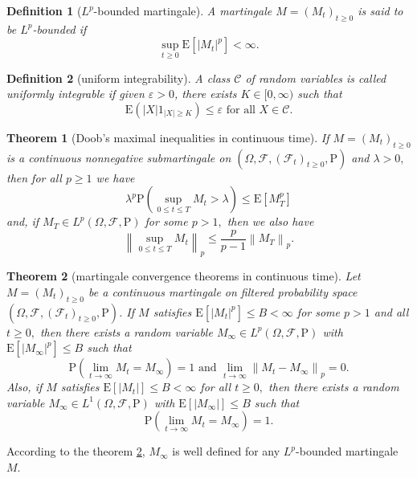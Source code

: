 \documentclass{report}
\newtheorem{definition}{Definition}[section]
\newtheorem{theorem}{Theorem}[section]
\theoremstyle{nonumberplain}
\begin{document}
\begin{definition}[$L^p$-bounded martingale]
	A martingale $M=(M_t)_{t\ge0}$ is said to be $L^p$-\emph{bounded} if 
	$$
	\sup _{t \geq 0} \mathrm{E}\left[|M_{t}|^{p}\right]<\infty.
	$$
\end{definition}


\begin{definition}[uniform integrability]
	A class $\mathcal {C}$ of random variables is called \emph{uniformly integrable} if given $\varepsilon >0$, there exists $K\in [0,\infty )$ such that 
	\[
	\mathrm{E}\left(|X| 1_{|X| \geq K}\right) \leq \varepsilon \text { for all } X \in \mathcal{C}.
	\]	
\end{definition}

\begin{theorem}[Doob's maximal inequalities in continuous time]
If $M=(M_{t})_{t\ge0}$ is a continuous nonnegative submartingale on $(\Omega,\mathcal{F},(\mathcal{F}_{t})_{t\ge0},\mathrm{P})$ and $\lambda>0,$ then for all $p \geq 1$ we have
\[
\lambda^{p} \mathrm{P}\left(\sup_{0 \le t \le T} M_{t}>\lambda\right) \le \mathrm{E}\left[M_{T}^{p}\right]
\]
and, if $M_{T} \in L^{p}(\Omega,\mathcal{F},\mathrm{P})$ for some $p>1,$ then we also have
\[
\left\|\sup_{0 \leq t \leq T} M_{t}\right\|_{p} \leq \frac{p}{p-1}\left\|M_{T}\right\|_{p}.
\]
\end{theorem}



\begin{theorem}[martingale convergence theorems in continuous time]\label{martingale convergence}
Let $M=(M_{t})_{t\ge0}$ be a continuous martingale on filtered probability space $(\Omega,\mathcal{F},(\mathcal{F}_{t})_{t\ge0},\mathrm{P})$. If $M$ satisfies $\mathrm{E}\left[\left|M_{t}\right|^{p}\right] \leq B<\infty$ for some $p>1$ and all $t \geq 0,$ then there exists a random variable $M_{\infty}\in L^p(\Omega,\mathcal{F},\mathrm{P})$ with $\mathrm{E}\left[\left|M_{\infty}\right|^p\right] \leq B$ such that
\[
\mathrm{P}\left(\lim _{t \rightarrow \infty} M_{t}=M_{\infty}\right)=1 \text { and } \lim _{t \rightarrow \infty}\left\|M_{t}-M_{\infty}\right\|_{p}=0.
\]
Also, if $M$ satisfies $\mathrm{E}\left[\left|M_{t}\right|\right]\le B<\infty$ for all $t \ge 0,$ then there exists a random variable $M_{\infty}\in L^1(\Omega,\mathcal{F},\mathrm{P})$ with $\mathrm{E}\left[\left|M_{\infty}\right|\right] \leq B$ such that
\[
\mathrm{P}\left(\lim _{t \rightarrow \infty} M_{t}=M_{\infty}\right)=1.
\]
\end{theorem}
According to the theorem \ref{martingale convergence}, $M_{\infty}$ is well defined for any $L^p$-bounded martingale $M$. 
\end{document}
